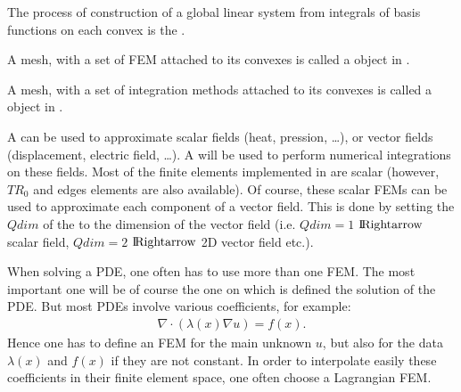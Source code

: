 \documentclass[a4paper,11pt,english]{sphinxmanual}
\begin{document}
The process of construction of a global linear system from integrals of basis
functions on each convex is the .

A mesh, with a set of FEM attached to its convexes is called a 
object in .

A mesh, with a set of integration methods attached to its convexes is called a
 object in .

A  can be used to approximate scalar fields (heat, pression, …), or vector
fields (displacement, electric field, …). A  will be used to perform
numerical integrations on these fields. Most of the finite elements implemented in
 are scalar (however, \(TR_0\) and edges elements are also available). Of
course, these scalar FEMs can be used to approximate each component of a vector
field. This is done by setting the \(Qdim\) of the  to the dimension of
the vector field (i.e. \(Qdim=1\) \(\rm I\hspace{-0.15em}Rightarrow\) scalar field,
\(Qdim=2\) \(\rm I\hspace{-0.15em}Rightarrow\) 2D vector field etc.).

When solving a PDE, one often has to use more than one FEM. The most important one
will be of course the one on which is defined the solution of the PDE. But most
PDEs involve various coefficients, for example:
\begin{equation*}
\begin{split}\nabla\cdot(\lambda(x)\nabla u) = f(x).\end{split}
\end{equation*}
Hence one has to define an FEM for the main unknown \(u\), but also for the
data \(\lambda(x)\) and \(f(x)\) if they are not constant. In order to
interpolate easily these coefficients in their finite element space, one often
choose a Lagrangian FEM.
\end{document}

